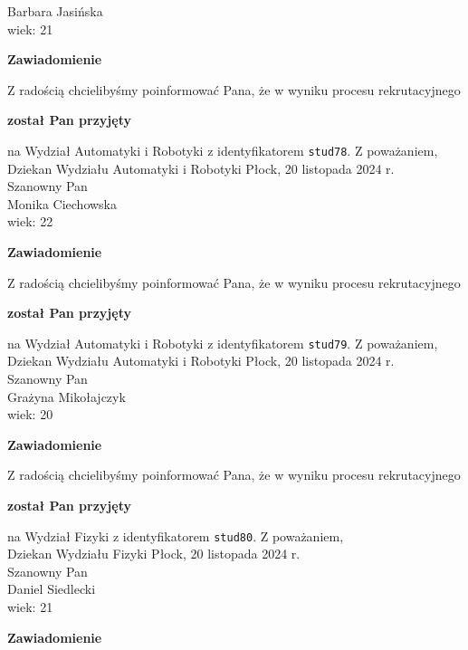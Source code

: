 \documentclass[12pt,a4paper]{article}
\begin{document}
Barbara Jasińska \\
wiek: 21
\bigskip
\begin{center}
 	{\Large\textbf{Zawiadomienie}}
\end{center}
\bigskip
Z radością chcielibyśmy poinformować Pana, że w wyniku procesu rekrutacyjnego 
\begin{center}
\textsf{\textbf{został Pan przyjęty}} 
\end{center}
na Wydział Automatyki i Robotyki z identyfikatorem \verb|stud78|. 
\vspace{2cm}
\noindent
Z poważaniem,\\
Dziekan
Wydziału Automatyki i Robotyki
\newpage
\hfill Płock, 20 listopada 2024 r.\\
\noindent 
Szanowny Pan \\
Monika Ciechowska \\
wiek: 22
\bigskip
\begin{center}
 	{\Large\textbf{Zawiadomienie}}
\end{center}
\bigskip
Z radością chcielibyśmy poinformować Pana, że w wyniku procesu rekrutacyjnego 
\begin{center}
\textsf{\textbf{został Pan przyjęty}} 
\end{center}
na Wydział Automatyki i Robotyki z identyfikatorem \verb|stud79|. 
\vspace{2cm}
\noindent
Z poważaniem,\\
Dziekan
Wydziału Automatyki i Robotyki
\newpage
\hfill Płock, 20 listopada 2024 r.\\
\noindent 
Szanowny Pan \\
Grażyna Mikołajczyk \\
wiek: 20
\bigskip
\begin{center}
 	{\Large\textbf{Zawiadomienie}}
\end{center}
\bigskip
Z radością chcielibyśmy poinformować Pana, że w wyniku procesu rekrutacyjnego 
\begin{center}
\textsf{\textbf{został Pan przyjęty}} 
\end{center}
na Wydział Fizyki z identyfikatorem \verb|stud80|. 
\vspace{2cm}
\noindent
Z poważaniem,\\
Dziekan
Wydziału Fizyki
\newpage
\hfill Płock, 20 listopada 2024 r.\\
\noindent 
Szanowny Pan \\
Daniel Siedlecki \\
wiek: 21
\bigskip
\begin{center}
 	{\Large\textbf{Zawiadomienie}}
\end{center}
\end{document}
